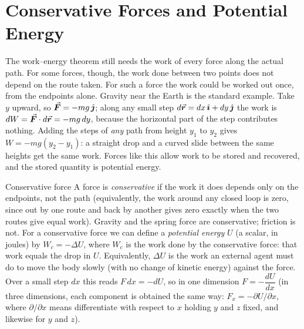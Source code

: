 \begin{figure}[htbp]
\centering
{}
\end{figure}

\section{Conservative Forces and Potential Energy}

The work--energy theorem still needs the work of every force along the actual path. For some forces, though, the work done between two points does not depend on the route taken.
For such a force the work could be worked out once, from the endpoints alone.
Gravity near the Earth is the standard example. Take $y$
upward, so $\vec{\bm{F}}=-mg\,\hat{\bm{\jmath}}$; along any
small step $d\vec{\bm{r}}=dx\,\hat{\bm{\imath}}+dy\,\hat{\bm{\jmath}}$ the work is $dW=\vec{\bm{F}}\cdot d\vec{\bm{r}}=-mg\,dy$, because the
horizontal part of the step contributes nothing. Adding the steps of \emph{any} path from height $y_1$
to $y_2$ gives $W=-mg(y_2-y_1)$: a straight drop and a curved slide between the same heights get the same work. Forces like this allow work to be stored and
recovered, and the stored quantity is potential energy.

\begin{defbox}{Conservative force}
A force is \emph{conservative} if the work it does depends only on the endpoints, not the path (equivalently,
the work around any closed loop is zero, since out by one route and back by another gives zero exactly
when the two routes give equal work).
Gravity and the spring force are conservative; friction is not.
For a conservative force we can define a \emph{potential energy} $U$ (a scalar, in joules) by
$W_c=-\Delta U$, where $W_c$ is the work done by the conservative force: that work equals the drop in
$U$. Equivalently, $\Delta U$ is the work an
external agent must do to move the body slowly (with no change of kinetic energy) against the force. Over
a small step $dx$ this reads $F\,dx=-dU$, so in one dimension $F=-\dfrac{dU}{dx}$ (in three dimensions,
each component is obtained the same way: $F_x=-\partial U/\partial x$, where $\partial/\partial x$ means
differentiate with respect to $x$ holding $y$ and $z$ fixed, and likewise for $y$ and $z$).
\end{defbox}

